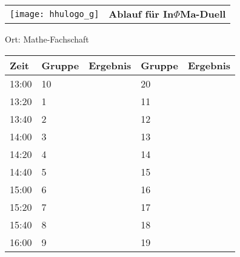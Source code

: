 \documentclass[a4paper,10pt]{article}
\def\spielj{In$\Phi $Ma-Duell}
\def\raumj{Mathe-Fachschaft}
\begin{document}
   \newpage
  \begin{tabularx}{\textwidth}{lc}
    \texttt{[image: hhulogo\_g]}
  & {\Huge \textbf{Ablauf für \spielj}}
  \end{tabularx}
  \LARGE
  \begin{center}
    \vspace{1cm} 
    Ort: \raumj
  \end{center}
    \vspace{2cm} 
    \begin{tabularx}{\textwidth}{X||X|X||X|X}
	\textbf{Zeit} &\textbf{Gruppe} & \textbf{Ergebnis} &\textbf{Gruppe} & \textbf{Ergebnis}  	\\ \hline \hline
	13:00 &	10	&	&20	&	\\ \hline
	13:20 &	1	&	&11	&	\\ \hline
	13:40 &	2	&	&12	&	\\ \hline

	14:00 &	3	&	&13	&	\\ \hline
	14:20 &	4	&	&14	&	\\ \hline
	14:40 &	5	&	&15	&	\\ \hline

	15:00 &	6	&	&16	&	\\ \hline
	15:20 &	7	&	&17	&	\\ \hline
	15:40 &	8	&	&18	&	\\ \hline

	16:00 &	9	&	&19	&	\\ \hline
      
    \end{tabularx}
   
   \newpage
\end{document}
